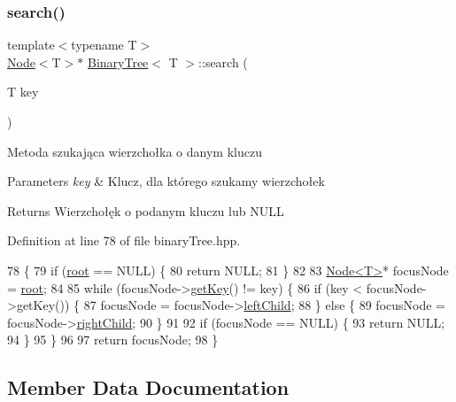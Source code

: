 \subsubsection{\texorpdfstring{search()}{search()}}
{\footnotesize\ttfamily template$<$typename T$>$ \\
\hyperlink{classNode}{Node}$<$T$>$$\ast$ \hyperlink{classBinaryTree}{Binary\+Tree}$<$ T $>$\+::search (\begin{DoxyParamCaption}\item[{T}]{key }\end{DoxyParamCaption})\hspace{0.3cm}{\ttfamily [inline]}}

Metoda szukająca wierzchołka o danym kluczu 
\begin{DoxyParams}{Parameters}
{\em key} & Klucz, dla którego szukamy wierzchołek \\
\hline
\end{DoxyParams}
\begin{DoxyReturn}{Returns}
Wierzchołęk o podanym kluczu lub N\+U\+LL 
\end{DoxyReturn}


Definition at line 78 of file binary\+Tree.\+hpp.


\begin{DoxyCode}
78                                \{
79             \textcolor{keywordflow}{if} (\hyperlink{classBinaryTree_a2db40f59d96afceb1a005e6d9aef2374}{root} == NULL) \{
80                 \textcolor{keywordflow}{return} NULL;
81             \}
82 
83             \hyperlink{classNode}{Node<T>}* focusNode = \hyperlink{classBinaryTree_a2db40f59d96afceb1a005e6d9aef2374}{root};
84 
85             \textcolor{keywordflow}{while} (focusNode->\hyperlink{classNode_a3c04afa4e4c8e555cc87a22757ab5f6a}{getKey}() != key) \{
86                 \textcolor{keywordflow}{if} (key < focusNode->getKey()) \{
87                     focusNode = focusNode->\hyperlink{classNode_a2eaaeffaeef97da6291b788fa131c9ec}{leftChild};
88                 \} \textcolor{keywordflow}{else} \{
89                     focusNode = focusNode->\hyperlink{classNode_a625cff56d169157a568afaedbb11576b}{rightChild};
90                 \}
91 
92                 \textcolor{keywordflow}{if} (focusNode == NULL) \{
93                     \textcolor{keywordflow}{return} NULL;
94                 \}
95             \}
96 
97             \textcolor{keywordflow}{return} focusNode;
98         \}
\end{DoxyCode}


\subsection{Member Data Documentation}
\mbox{\label{classBinaryTree_a2db40f59d96afceb1a005e6d9aef2374}} 
